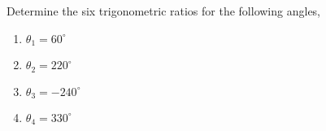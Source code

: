 \documentclass[12pt]{article} %
\begin{document}
  \begin{qstn}
    Determine the six trigonometric ratios for the following angles,
    \begin{multicols}{4}
      \begin{enumerate}[label=(\alph*)]
        \item $\theta_1 = 60^{\circ}$
          \columnbreak
        \item $\theta_2 = 220^{\circ}$
          \columnbreak
        \item $\theta_3 = -240^{\circ}$
          \columnbreak
        \item $\theta_4 = 330^{\circ}$
      \end{enumerate}
      
    \end{multicols}

  \end{qstn}
\end{document}
